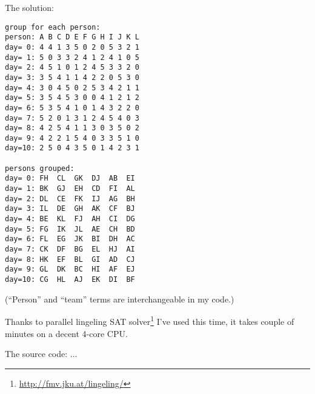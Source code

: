 The solution:

\begin{lstlisting}
group for each person:
person: A B C D E F G H I J K L
day= 0: 4 4 1 3 5 0 2 0 5 3 2 1
day= 1: 5 0 3 3 2 4 1 2 4 1 0 5
day= 2: 4 5 1 0 1 2 4 5 3 3 2 0
day= 3: 3 5 4 1 1 4 2 2 0 5 3 0
day= 4: 3 0 4 5 0 2 5 3 4 2 1 1
day= 5: 3 5 4 5 3 0 0 4 1 2 1 2
day= 6: 5 3 5 4 1 0 1 4 3 2 2 0
day= 7: 5 2 0 1 3 1 2 4 5 4 0 3
day= 8: 4 2 5 4 1 1 3 0 3 5 0 2
day= 9: 4 2 2 1 5 4 0 3 3 5 1 0
day=10: 2 5 0 4 3 5 0 1 4 2 3 1

persons grouped:
day= 0: FH  CL  GK  DJ  AB  EI
day= 1: BK  GJ  EH  CD  FI  AL
day= 2: DL  CE  FK  IJ  AG  BH
day= 3: IL  DE  GH  AK  CF  BJ
day= 4: BE  KL  FJ  AH  CI  DG
day= 5: FG  IK  JL  AE  CH  BD
day= 6: FL  EG  JK  BI  DH  AC
day= 7: CK  DF  BG  EL  HJ  AI
day= 8: HK  EF  BL  GI  AD  CJ
day= 9: GL  DK  BC  HI  AF  EJ
day=10: CG  HL  AJ  EK  DI  BF
\end{lstlisting}

(``Person'' and ``team'' terms are interchangeable in my code.)

Thanks to 
parallel lingeling SAT solver\footnote{\url{http://fmv.jku.at/lingeling/}}
I've used this time, it takes couple of minutes on a decent 4-core CPU.

The source code: ...

